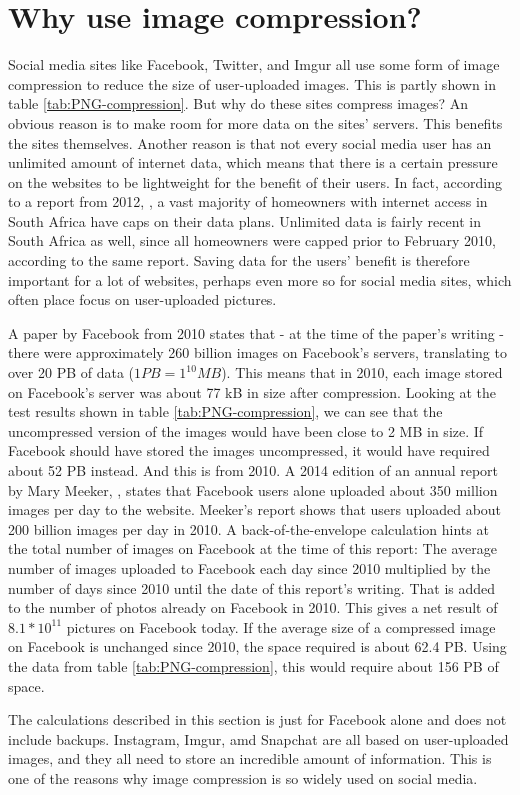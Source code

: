 \section{Why use image compression?}
Social media sites like Facebook, Twitter, and Imgur all use some form of image compression to reduce the size of user-uploaded images.
This is partly shown in table \ref{tab:PNG-compression}.
But why do these sites compress images?
An obvious reason is to make room for more data on the sites' servers.
This benefits the sites themselves.
Another reason is that not every social media user has an unlimited amount of internet data, which means that there is a certain pressure on the websites to be lightweight for the benefit of their users.
In fact, according to a report from 2012, \citep{chetty_2012}, a vast majority of homeowners with internet access in South Africa have caps on their data plans.
Unlimited data is fairly recent in South Africa as well, since all homeowners were capped prior to February 2010, according to the same report.
Saving data for the users' benefit is therefore important for a lot of websites, perhaps even more so for social media sites, which often place focus on user-uploaded pictures.

A paper by Facebook from 2010 \citep{beaver2010} states that - at the time of the paper's writing - there were approximately 260 billion images on Facebook's servers, translating to over 20 PB of data ($1 PB = 1^{10} MB$).
This means that in 2010, each image stored on Facebook's server was about 77 kB in size after compression.
Looking at the test results shown in table \ref{tab:PNG-compression}, we can see that the uncompressed version of the images would have been close to 2 MB in size.
If Facebook should have stored the images uncompressed, it would have required about 52 PB instead.
And this is from 2010.
A 2014 edition of an annual report by Mary Meeker, \citep{meeker2014internet}, states that Facebook users alone uploaded about
350 million images per day to the website.
Meeker's report shows that users uploaded about 200 billion images per day in 2010.
A back-of-the-envelope calculation hints at the total number of images on Facebook at the time of this report:
The average number of images uploaded to Facebook each day since 2010 multiplied by the number of days since 2010 until the date of this report's writing.
That is added to the number of photos already on Facebook in 2010.
This gives a net result of $8.1*10^{11}$ pictures on Facebook today.
If the average size of a compressed image on Facebook is unchanged since 2010, the space required is about 62.4 PB.
Using the data from table \ref{tab:PNG-compression}, this would require about 156 PB of space.

The calculations described in this section is just for Facebook alone and does not include backups. Instagram, Imgur, amd Snapchat are all based on user-uploaded images, and they all need to store an incredible amount of information.
This is one of the reasons why image compression is so widely used on social media.
